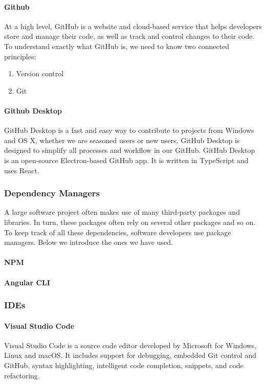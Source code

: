 \paragraph*{Github}
At a high level, GitHub is a website and cloud-based service that helps developers store and manage their code, as well as track and control changes to their code. To understand exactly what GitHub is, we need to know two connected principles:
\begin{enumerate}
      \item Version control
      \item Git
\end{enumerate}

\paragraph{Github Desktop}
GitHub Desktop is a fast and easy way to contribute to projects from Windows and OS X, whether we are seasoned users or new users, GitHub Desktop is designed to simplify all processes and workflow in our GitHub. GitHub Desktop is an open-source Electron-based GitHub app. It is written in TypeScript and uses React.


\subsubsection{Dependency Managers}
A large software project often makes use of many third-party packages and libraries. In turn, these packages
often rely on several other packages and so on. To keep track of all these dependencies, software developers
use package managers. Below we introduce the ones we have used.
\paragraph*{NPM}
\paragraph*{Angular CLI}

\subsubsection{IDEs}

\paragraph*{Visual Studio Code}
Visual Studio Code is a source code editor developed by Microsoft for Windows, Linux and macOS. It includes support for debugging, embedded Git control and GitHub, syntax highlighting, intelligent code completion, snippets, and code refactoring.


